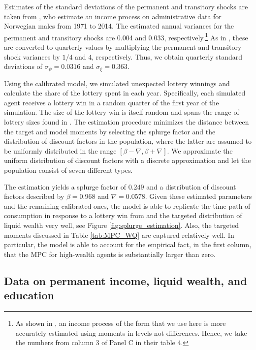 \documentclass[\econtexRoot/HAFiscal]{subfiles}
\begin{document}
Estimates of the standard deviations of the permanent and transitory shocks are taken from \citet{crawley2024Parsimonious}, who estimate an income process on administrative data for Norwegian males from 1971 to 2014.
The estimated annual variances for the permanent and transitory shocks are 0.004 and 0.033, respectively.\footnote{As shown in \citet{crawley2024Parsimonious}, an income process of the form that we use here is more accurately estimated using moments in levels not differences.
Hence, we take the numbers from column 3 of Panel C in their table 4.} As in \citet{carroll2020sticky}, these are converted to quarterly values by multiplying the permanent and transitory shock variances by $1/4$ and $4$, respectively.
Thus, we obtain quarterly standard deviations of $\sigma_\psi=0.0316$ and $\sigma_\xi=0.363$.

Using the calibrated model, we simulated unexpected lottery winnings and calculate the share of the lottery spent in each year.
Specifically, each simulated agent receives a lottery win in a random quarter of the first year of the simulation.
The size of the lottery win is itself random and spans the range of lottery sizes found in \citet{fagereng_mpc_2021}.
The estimation procedure minimizes the distance between the target and model moments by selecting the splurge factor and the distribution of discount factors in the population, where the latter are assumed to be uniformly distributed in the range $[\beta-\nabla, \beta+\nabla]$.
We approximate the uniform distribution of discount factors with a discrete approximation and let the population consist of seven different types.

The estimation yields a splurge factor of $0.249$ and a distribution of discount factors described by $\beta = 0.968$ and $\nabla=0.0578$.
Given these estimated parameters and the remaining calibrated ones, the model is able to replicate the time path of consumption in response to a lottery win from \citet{fagereng_mpc_2021} and the targeted distribution of liquid wealth very well, see Figure \ref{fig:splurge_estimation}.
Also, the targeted moments discussed in Table \ref{tab:MPC_WQ} are captured relatively well.
In particular, the model is able to account for the empirical fact, in the first column, that the MPC for high-wealth agents is substantially larger than zero.




 

\hypertarget{data-on-permanent-income-liquid-wealth-and-education}{}\par\subsection{Data on permanent income, liquid wealth, and education}
\notinsubfile{\label{sec:SCFdata}}
\end{document}
